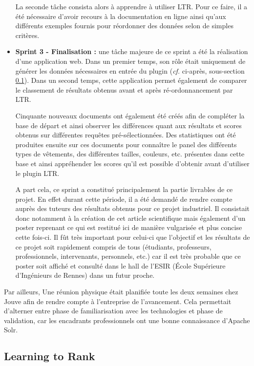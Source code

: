 \documentclass[twocolumn,a4paper]{IEEEtranfr}
\begin{document}
\begin{itemize}
  La seconde tâche consista alors à apprendre à utiliser LTR. Pour ce faire, il a été nécessaire d'avoir recours à la documentation en ligne ainsi qu'aux différents exemples fournis pour réordonner des données selon de simples critères.\\
  
  
  \item \textbf{Sprint 3 - Finalisation :} une tâche majeure de ce sprint a été la réalisation d'une application web. Dans un premier temps, son rôle était uniquement de générer les données nécessaires en entrée du plugin (\textit{cf.} ci-après, sous-section \ref{ssec:ltr}). Dans un second temps, cette application permet également de comparer le classement de résultats obtenus avant et après ré-ordonnancement par LTR.
  
  Cinquante nouveaux documents ont également été créés afin de compléter la base de départ et ainsi observer les différences quant aux résultats et scores obtenus sur différentes requêtes pré-sélectionnées. Des statistiques ont été produites ensuite sur ces documents pour connaître le panel des différents types de vêtements, des différentes tailles, couleurs, etc. présentes dans cette base et ainsi appréhender les scores qu'il est possible d'obtenir avant d'utiliser le plugin LTR.
  
  A part cela, ce sprint a constitué principalement la partie livrables de ce projet. En effet durant cette période, il a été demandé de rendre compte auprès des tuteurs des résultats obtenus pour ce projet industriel. Il consistait donc notamment à la création de cet article scientifique mais également d'un poster reprenant ce qui est restitué ici de manière vulgarisée et plus concise cette fois-ci. Il fût très important pour celui-ci que l'objectif et les résultats de ce projet soit rapidement compris de tous (étudiants, professeurs, professionnels, intervenants, personnels, etc.) car il est très probable que ce poster soit affiché et consulté dans le hall de l'ESIR (École Supérieure d'Ingénieurs de Rennes) dans un futur proche.\\
\end{itemize}

Par ailleurs, Une réunion physique était planifiée toute les deux semaines chez Jouve afin de rendre compte à l'entreprise de l'avancement. Cela permettait d'alterner entre phase de familiarisation avec les technologies et phase de validation, car les encadrants professionnels ont une bonne connaissance d'Apache Solr.


\subsection{Learning to Rank}\label{ssec:ltr}
\end{document}
